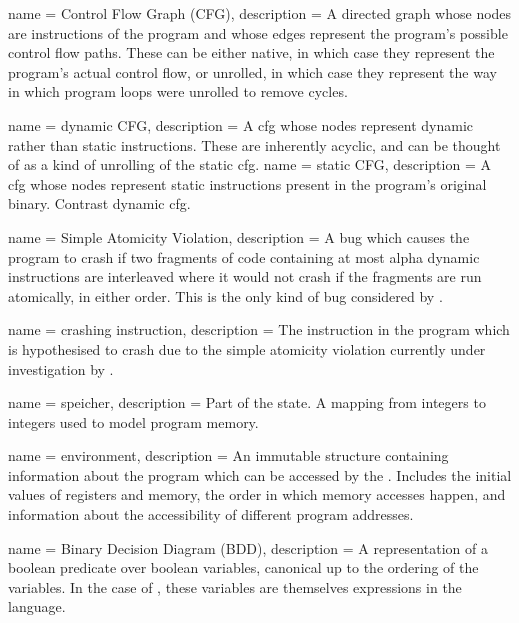 {
  name = Control Flow Graph (CFG),
  description = {A directed graph whose nodes are instructions
    of the program and whose edges represent the program's possible
    control flow paths.  These can be either native, in which
    case they represent the program's actual control flow, or
    unrolled, in which case they represent the way in which program
    loops were unrolled to remove cycles.
  }
}

{
  name = {dynamic CFG},
  description = {A \gls{cfg} whose nodes represent dynamic rather than
    static instructions.  These are inherently acyclic, and can be thought
    of as a kind of unrolling of the \gls{static cfg}.}
}
{
  name = {static CFG},
  description = {A \gls{cfg} whose nodes represent static instructions
    present in the program's original binary.  Contrast \gls{dynamic cfg}.}
}

{
  name = Simple Atomicity Violation,
  description = {A bug which causes the program to crash if two fragments of
    code containing at most \gls{alpha} dynamic instructions are interleaved where
    it would not crash if the fragments are run atomically, in either order.
    This is the only kind of bug considered by {\technique}.}
}

{
  name = {crashing instruction},
  description = {The instruction in the program which is hypothesised to crash
    due to the \gls{simple atomicity violation} currently under investigation by
    {\technique}.}
}

 { name = {speicher}, description = {Part
    of the {\StateMachine} state.  A mapping from integers to integers
    used to model program memory.} }

 { name = {environment}, description =
  {An immutable structure containing information about the program
    which can be accessed by the {\StateMachine}.  Includes the
    initial values of registers and memory, the order in which memory
    accesses happen, and information about the accessibility of
    different program addresses. }}

{
  name = Binary Decision Diagram (BDD),
  description = {A representation of a boolean predicate over boolean
    variables, canonical up to the ordering of the variables.  In the
    case of {\technique}, these variables are themselves expressions in
    the {\StateMachine} language.}
}

